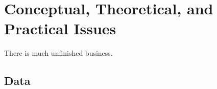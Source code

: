 %
%
%

\chapter{Conceptual, Theoretical, and Practical Issues}
\label{chap:unfinished_business}





There is much unfinished business.


\section{Data}
\label{sec:Data}

